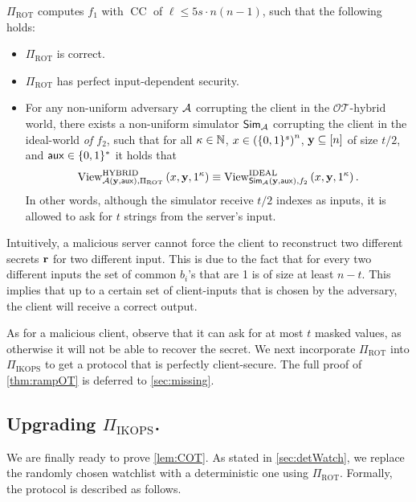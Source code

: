 \documentclass{llncs}
\newcommand{\OTfunc}{\mathcal{OT}}
\newcommand{\OThybrid}{\OTfunc\mbox{-}\text{hybrid}}
\newcommand{\sOT}[3]{\binom{#2}{#1}\text{-}#3\text{-string-OT}}
\newcommand{\rampOT}{\operatorname{ROT}}
\newcommand{\ROT}{\operatorname{ROT}}
\newcommand{\y}{\myvec{y}}
\newcommand{\aux}{\mathsf{aux}}
\newcommand{\HYBRID}{\operatorname{HYBRID}}
\newcommand{\IDEAL}{\operatorname{IDEAL}}
\newcommand{\View}{\operatorname{View}}
\newcommand{\CC}{\operatorname{CC}}
\newcommand{\IKOPS}{\operatorname{IKOPS}}
\begin{document}
\begin{lemma}\label{thm:rampOT}%
	$\Pi_{\rampOT}$ computes $f_1$ with $\CC$ of $\ell\leq 5s\cdot n(n-1)$, such that the following holds:
	\begin{itemize}
	\item $\Pi_{\rampOT}$ is correct.
	\item $\Pi_{\rampOT}$ has perfect input-dependent security.
	\item For any non-uniform adversary $\mathcal{A}$ corrupting the client in the $\OThybrid$ world, there exists a non-uniform simulator $\mathsf{Sim}_{\mathcal{A}}$ corrupting the client in the ideal-world \emph{of $f_2$}, such that for all $\kappa\in{\mathbb{N}}$, $x\in\left(\{0,1\}^s\right)^n$, $\y\su[n]$ of size $t/2$, and $\aux\in\zo^*$ it holds that
    $$\View^{\HYBRID}_{\adv\of{\y,\aux},\Pi_{\rampOT}}\of{x,\y,1^{\kappa}} \equiv\View^{\IDEAL}_{\Sim_{\adv}\of{\y,\aux},f_2}\of{x,\y,1^{\kappa}}.$$
	In other words, although the simulator receive $t/2$ indexes as inputs, it is allowed to ask for $t$ strings from the server's input.
	 \end{itemize} 
\end{lemma}

Intuitively, a malicious server cannot force the client to reconstruct two different secrets ${\bf r}$ for two different input. This is due to the fact that for every two different inputs the set of common $b_i$'s that are 1 is of size at least $n-t$. This implies that up to a certain set of client-inputs that is chosen by the adversary, the client will receive  a correct output.

As for a malicious client, observe that it can ask for at most $t$ masked values, as otherwise it will not be able to recover the secret. We next incorporate $\Pi_{\ROT}$ into $\Pi_{\IKOPS}$ to get a protocol that is perfectly client-secure. The full proof of \cref{thm:rampOT} is deferred to \cref{sec:missing}.

\subsection{Upgrading $\Pi_{\IKOPS}$.}\label{sec:up-ikops}
We are finally ready to prove \cref{lem:COT}. As stated in \cref{sec:detWatch}, we replace the randomly chosen watchlist with a deterministic one using $\Pi_{\ROT}$. Formally, the protocol is described as follows.
\end{document}
